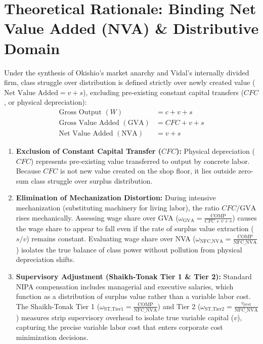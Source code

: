 \documentclass[11pt,a4paper]{article}
\begin{document}
\section*{Theoretical Rationale: Binding Net Value Added (NVA) \& Distributive Domain}
Under the synthesis of Okishio's market anarchy and Vidal's internally divided firm, class struggle over distribution is defined strictly over newly created value ($\text{Net Value Added} = v + s$), excluding pre-existing constant capital transfers ($CFC$, or physical depreciation):
\begin{align*}
\text{Gross Output } (W) &= c + v + s \\
\text{Gross Value Added } (\text{GVA}) &= CFC + v + s \\
\text{Net Value Added } (\text{NVA}) &= v + s
\end{align*}
\begin{enumerate}
    \item \textbf{Exclusion of Constant Capital Transfer ($CFC$):} Physical depreciation ($CFC$) represents pre-existing value transferred to output by concrete labor. Because $CFC$ is not new value created on the shop floor, it lies outside zero-sum class struggle over surplus distribution.
    \item \textbf{Elimination of Mechanization Distortion:} During intensive mechanization (substituting machinery for living labor), the ratio $CFC / \text{GVA}$ rises mechanically. Assessing wage share over GVA ($\omega_{\text{GVA}} = \frac{\text{COMP}}{CFC + v + s}$) causes the wage share to appear to fall even if the rate of surplus value extraction ($s/v$) remains constant. Evaluating wage share over NVA ($\omega_{\text{NFC,NVA}} = \frac{\text{COMP}}{\text{NFC\_NVA}}$) isolates the true balance of class power without pollution from physical depreciation shifts.
    \item \textbf{Supervisory Adjustment (Shaikh-Tonak Tier 1 \& Tier 2):} Standard NIPA compensation includes managerial and executive salaries, which function as a distribution of surplus value rather than a variable labor cost. The Shaikh-Tonak Tier 1 ($\omega_{\text{ST,Tier1}} = \frac{\text{COMP}}{\text{NFC\_NVA}}$) and Tier 2 ($\omega_{\text{ST,Tier2}} = \frac{v_{\text{prod}}}{\text{NFC\_NVA}}$) measures strip supervisory overhead to isolate true variable capital ($v$), capturing the precise variable labor cost that enters corporate cost minimization decisions.
\end{enumerate}
\end{document}
